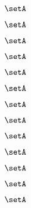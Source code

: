 \begin{forslides}
    \begin{equation}
        \label{eq:slides-processes-132}
        \setA
    \end{equation}

    \begin{equation}
        \label{eq:slides-processes-133}
        \setA
    \end{equation}

    \begin{equation}
        \label{eq:slides-processes-134}
        \setA
    \end{equation}

    \begin{equation}
        \label{eq:slides-processes-135}
        \setA
    \end{equation}

    \begin{equation}
        \label{eq:slides-processes-136}
        \setA
    \end{equation}

    \begin{equation}
        \label{eq:slides-processes-137}
        \setA
    \end{equation}

    \begin{equation}
        \label{eq:slides-processes-138}
        \setA
    \end{equation}

    \begin{equation}
        \label{eq:slides-processes-139}
        \setA
    \end{equation}
    
    \begin{equation}
        \label{eq:slides-processes-140}
        \setA
    \end{equation}

    \begin{equation}
        \label{eq:slides-processes-141}
        \setA
    \end{equation}

    \begin{equation}
        \label{eq:slides-processes-142}
        \setA
    \end{equation}

    \begin{equation}
        \label{eq:slides-processes-143}
        \setA
    \end{equation}

    \begin{equation}
        \label{eq:slides-processes-144}
        \setA
    \end{equation}


\end{forslides}
